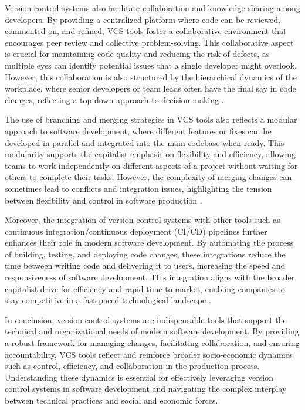 \begin{refsection}
Version control systems also facilitate collaboration and knowledge sharing among developers. By providing a centralized platform where code can be reviewed, commented on, and refined, VCS tools foster a collaborative environment that encourages peer review and collective problem-solving. This collaborative aspect is crucial for maintaining code quality and reducing the risk of defects, as multiple eyes can identify potential issues that a single developer might overlook. However, this collaboration is also structured by the hierarchical dynamics of the workplace, where senior developers or team leads often have the final say in code changes, reflecting a top-down approach to decision-making \cite[pp.~102-105]{Bass2021}.

The use of branching and merging strategies in VCS tools also reflects a modular approach to software development, where different features or fixes can be developed in parallel and integrated into the main codebase when ready. This modularity supports the capitalist emphasis on flexibility and efficiency, allowing teams to work independently on different aspects of a project without waiting for others to complete their tasks. However, the complexity of merging changes can sometimes lead to conflicts and integration issues, highlighting the tension between flexibility and control in software production \cite[pp.~76-79]{Fowler1999}.

Moreover, the integration of version control systems with other tools such as continuous integration/continuous deployment (CI/CD) pipelines further enhances their role in modern software development. By automating the process of building, testing, and deploying code changes, these integrations reduce the time between writing code and delivering it to users, increasing the speed and responsiveness of software development. This integration aligns with the broader capitalist drive for efficiency and rapid time-to-market, enabling companies to stay competitive in a fast-paced technological landscape \cite[pp.~304-306]{Sommerville2016}.

In conclusion, version control systems are indispensable tools that support the technical and organizational needs of modern software development. By providing a robust framework for managing changes, facilitating collaboration, and ensuring accountability, VCS tools reflect and reinforce broader socio-economic dynamics such as control, efficiency, and collaboration in the production process. Understanding these dynamics is essential for effectively leveraging version control systems in software development and navigating the complex interplay between technical practices and social and economic forces.


\end{refsection}
